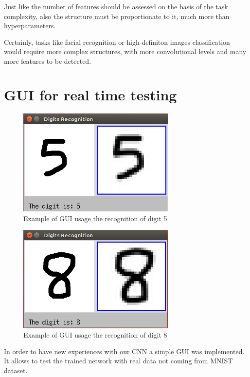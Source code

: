 Just like the number of features should be assessed on the basis of the task complexity, also the structure must be proportionate to it, much more than hyperparameters.

Certainly, tasks like facial recognition or high-definiton images classification would require more complex structures, with more convolutional levels and many more features to be detected.

\section{GUI for real time testing}

\begin{figure}
	\centering
	\includegraphics[width=0.7\textwidth]{Images/GUI_5}
	\caption{Example of \acs{GUI} usage the recognition of digit 5}
	\label{fig:GUI_5}
\end{figure}

\begin{figure}
	\centering
	\includegraphics[width=0.7\textwidth]{Images/GUI_8}
	\caption{Example of \acs{GUI} usage the recognition of digit 8}
	\label{fig:GUI_8}
\end{figure}

In order to have new experiences with our \acs{CNN} a simple \acs{GUI} was implemented. It allows to test the trained network with real data not coming from \acs{MNIST} dataset.

